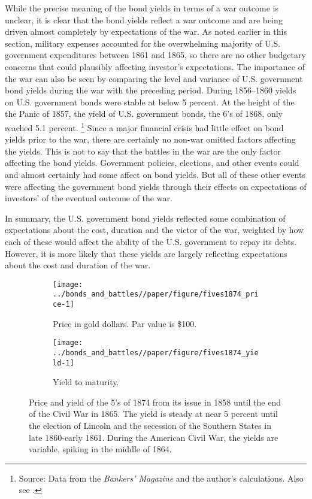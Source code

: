 
While the precise meaning of the bond yields in terms of a war outcome is unclear, it is clear that the bond yields reflect a war outcome and are being driven almost completely by expectations of the war.
As noted earlier in this section, military expenses accounted for the overwhelming majority of U.S. government expenditures between 1861 and 1865, so there are no other budgetary concerns that could plausibly affecting investor's expectations.
The importance of the war can also be seen by comparing the level and variance of U.S. government bond yields during the war with the preceding period.
During 1856--1860 yields on U.S. government bonds were stable at below 5 percent.
At the height of the the Panic of 1857, the yield of U.S. government bonds, the 6's of 1868, only reached 5.1 percent.%
\footnote{Source: Data from the \textit{Bankers' Magazine} and the author's calculations. Also see \textcite{HomerSylla2005}.}
Since a major financial crisis had little effect on bond yields prior to the war, there are certainly no non-war omitted factors affecting the yields.
This is not to say that the battles in the war are the only factor affecting the bond yields.
Government policies, elections, and other events could and almost certainly had some affect on bond yields.
But all of these other events were affecting the government bond yields through their effects on expectations of investors' of the eventual outcome of the war.

In summary, the U.S. government bond yields reflected some combination of expectations about the cost, duration and the victor of the war, weighted by how each of these would affect the ability of the U.S. government to repay its debts.
However, it is more likely that these yields are largely reflecting expectations about the cost and duration of the war.

\begin{figure}[!]
  \centering
  \begin{subfigure}[b]{\linewidth}
   \texttt{[image: ../bonds\_and\_battles//paper/figure/fives1874\_price-1]}
  \caption{Price in gold dollars. Par value is \$100.}
  \label{bonds_battles:fig:fives1874_price}
\end{subfigure}
\begin{subfigure}[b]{\linewidth}
   \texttt{[image: ../bonds\_and\_battles//paper/figure/fives1874\_yield-1]}
  \caption{Yield to maturity.}
  \label{bonds_battles:fig:fives1874_yield}
\end{subfigure}
\caption[Price and yield of the 5's of 1874, 1858-1865]{Price and yield of the 5's of 1874 from its issue in 1858 until the end of the Civil War in 1865.
The yield is steady at near 5 percent until the election of Lincoln and the secession of the Southern States in late 1860-early 1861.
During the American Civil War, the yields are variable, spiking in the middle of 1864.
 }
\label{bonds_battles:fig:fives1874_yield_price}
\end{figure}


